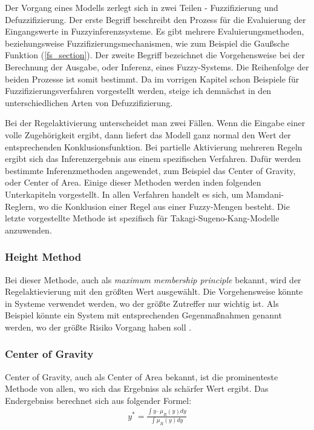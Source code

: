 Der Vorgang eines Modells zerlegt sich in zwei Teilen - Fuzzifizierung und Defuzzifizierung. Der erste Begriff beschreibt den Prozess für die Evaluierung der Eingangswerte in Fuzzyinferenzsysteme. Es gibt mehrere Evaluierungsmethoden, beziehungsweise Fuzzifizierungsmechanismen, wie zum Beispiel die Gaußsche Funktion (\ref{fs_section}). Der zweite Begriff bezeichnet die Vorgehensweise bei der Berechnung der Ausgabe, oder Inferenz, eines Fuzzy-Systems. Die Reihenfolge der beiden Prozesse ist somit bestimmt. Da im vorrigen Kapitel schon Beispiele für Fuzzifizierungsverfahren vorgestellt werden, steige ich demnächst in den unterschiedlichen Arten von Defuzzifizierung.

Bei der Regelaktivierung unterscheidet man zwei Fällen. Wenn die Eingabe einer volle Zugehörigkeit ergibt, dann liefert das Modell ganz normal den Wert der entsprechenden Konklusionsfunktion. Bei partielle Aktivierung mehreren Regeln ergibt sich das Inferenzergebnis aus einem spezifischen Verfahren. Dafür werden bestimmte Inferenzmethoden angewendet, zum Beispiel das Center of Gravity, oder Center of Area. Einige dieser Methoden werden inden folgenden Unterkapiteln vorgestellt. In allen Verfahren handelt es sich, um Mamdani-Reglern, wo die Konklusion einer Regel aus einer Fuzzy-Mengen besteht. Die letzte vorgestellte Methode ist spezifisch für Takagi-Sugeno-Kang-Modelle anzuwenden.

\subsubsection{Height Method}
Bei dieser Methode, auch als \textit{maximum membership principle} bekannt, wird der Regelaktievierung mit den größten Wert ausgewählt. Die Vorgehensweise könnte in Systeme verwendet werden, wo der größte Zutreffer nur wichtig ist. Als Beispiel könnte ein System mit entsprechenden Gegenmaßnahmen genannt werden, wo der größte Risiko Vorgang haben soll \cite{SCTemassi:01}.

\subsubsection{Center of Gravity}

Center of Gravity, auch als Center of Area bekannt, ist die prominenteste Methode von allen, wo sich das Ergebniss als schärfer Wert ergibt. Das Endergebniss berechnet sich aus folgender Formel:
\begin{align}
	y^* = \frac{\int y \cdot \mu_R(y)dy}{\int \mu_R(y)dy}
\end{align}

